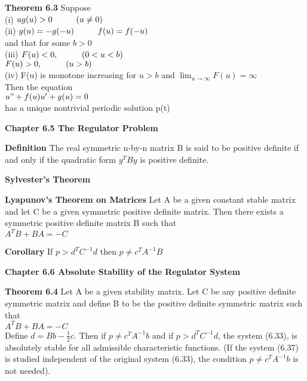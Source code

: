 \documentclass{article}
\newcommand\tab[1][1cm]{\hspace*{#1}}
\begin{document}
\textbf {Theorem 6.3} Suppose \\
(i) $ug(u) > 0 \tab (u \neq 0)$ \\
(ii) $g(u) = -g(-u) \tab f(u) = f(-u)$ \\
and that for some $b > 0$ \\
(iii) $F(u) < 0, \tab (0 < u < b)$ \\
\tab $F(u) > 0, \tab (u > b)$ \\
(iv) F(u) is monotone increasing for $u > b$ and $\lim_{u \to \infty} F(u) = \infty$ \\
Then the equation \\
\tab $u" + f(u)u' + g(u) = 0$ \\
has a unique nontrivial periodic solution p(t)

\textbf {Chapter 6.5 The Regulator Problem}

\textbf {Definition} The real symmetric n-by-n matrix B is said to be positive definite if and only if the quadratic form $y^TBy$ is positive definite.

\textbf {Sylvester's Theorem}

\textbf {Lyapunov's Theorem on Matrices} Let A be a given constant stable matrix and let C be a given symmetric positive definite matrix. Then there exists a symmetric positive definite matrix B such that \\
\tab $A^T B + BA = -C$

\textbf {Corollary} If $p > d^T C^{-1}d$ then $p \neq c^T A^{-1}B$

\textbf {Chapter 6.6 Absolute Stability of the Regulator System}

\textbf {Theorem 6.4} Let A be a given stability matrix. Let C be any positive definite symmetric matrix and define B to be the positive definite symmetric matrix such that \\
\tab $A^T B + BA = -C$ \\
Define $d = Bb - \frac{1}{2}c$. Then if $p \neq c^T A^{-1}b$ and if $p > d^T C^{-1}d$, the system (6.33), is absolutely stable for all admissible characteristic functions. (If the system (6.37) is studied independent of the original system (6.33), the condition $p \neq c^T A^{-1}b$ is not needed).
\end{document}
